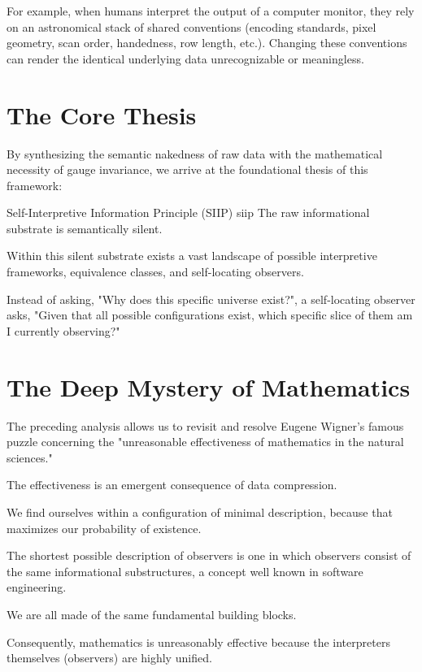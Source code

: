 For example, when humans interpret the output of a computer monitor, they rely on an astronomical stack of shared conventions (encoding standards,
pixel geometry, scan order, handedness, row length, etc.). Changing these conventions can render the identical underlying data unrecognizable or meaningless.



\section{The Core Thesis}

By synthesizing the semantic nakedness of raw data with the mathematical necessity of gauge invariance, we arrive at the foundational thesis of this framework:

\begin{principle}{Self-Interpretive Information Principle (SIIP)}
{siip}
The raw informational substrate is semantically silent.

Within this silent substrate exists a vast landscape of possible interpretive frameworks, equivalence classes, and self-locating observers.
\end{principle}

Instead of asking, "Why does this specific universe exist?", a self-locating observer asks,
"Given that all possible configurations exist, which specific slice of them am I currently observing?"



\section{The Deep Mystery of Mathematics}

The preceding analysis allows us to revisit and resolve Eugene Wigner's famous puzzle concerning the "unreasonable effectiveness of mathematics in the natural sciences."

The effectiveness is an emergent consequence of data compression.

We find ourselves within a configuration of minimal description, because that maximizes our probability of existence.

The shortest possible description of observers is one in which observers consist of the same informational substructures, a concept well known in software engineering.

We are all made of the same fundamental building blocks.

Consequently, mathematics is unreasonably effective because the interpreters themselves (observers) are highly unified.

